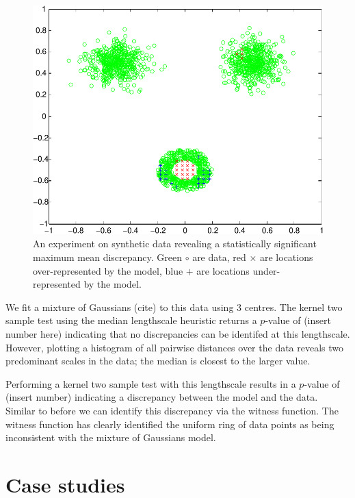 \documentclass{article}
\begin{document}
\begin{figure}[ht]
\centering
\includegraphics[width=0.98\columnwidth]{figures/blob_blob_ring}
\caption{
An experiment on synthetic data revealing a statistically significant maximum mean discrepancy.
Green $\circ$ are data, red $\times$ are locations over-represented by the model, blue $+$ are locations under-represented by the model.
}
\label{fig:blob_blob_ring}
\end{figure}

We fit a mixture of Gaussians (cite) to this data using 3 centres.
The kernel two sample test using the median lengthscale heuristic returns a $p$-value of (insert number here) indicating that no discrepancies can be identifed at this lengthscale.
However, plotting a histogram of all pairwise distances over the data reveals two predominant scales in the data; the median is closest to the larger value.

Performing a kernel two sample test with this lengthscale results in a $p$-value of (insert number) indicating a discrepancy between the model and the data.
Similar to before we can identify this discrepancy via the witness function.
The witness function has clearly identified the uniform ring of data points as being inconsistent with the mixture of Gaussians model.


\section{Case studies}
\end{document}
